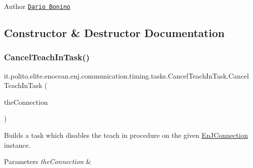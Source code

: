 \begin{DoxyAuthor}{Author}
\href{mailto:dario.bonino@gmail.com}{\tt Dario Bonino} 
\end{DoxyAuthor}


\subsection{Constructor \& Destructor Documentation}
\hypertarget{classit_1_1polito_1_1elite_1_1enocean_1_1enj_1_1communication_1_1timing_1_1tasks_1_1_cancel_teach_in_task_a9bcf4c5d3eefc428376ba051a651e22a}{}\label{classit_1_1polito_1_1elite_1_1enocean_1_1enj_1_1communication_1_1timing_1_1tasks_1_1_cancel_teach_in_task_a9bcf4c5d3eefc428376ba051a651e22a} 
\subsubsection{\texorpdfstring{Cancel\+Teach\+In\+Task()}{CancelTeachInTask()}}
{\footnotesize\ttfamily it.\+polito.\+elite.\+enocean.\+enj.\+communication.\+timing.\+tasks.\+Cancel\+Teach\+In\+Task.\+Cancel\+Teach\+In\+Task (\begin{DoxyParamCaption}\item[{\hyperlink{classit_1_1polito_1_1elite_1_1enocean_1_1enj_1_1communication_1_1_en_j_connection}{En\+J\+Connection}}]{the\+Connection }\end{DoxyParamCaption})}

Builds a task which disables the teach in procedure on the given \hyperlink{classit_1_1polito_1_1elite_1_1enocean_1_1enj_1_1communication_1_1_en_j_connection}{En\+J\+Connection} instance.


\begin{DoxyParams}{Parameters}
{\em the\+Connection} & \\
\hline
\end{DoxyParams}


